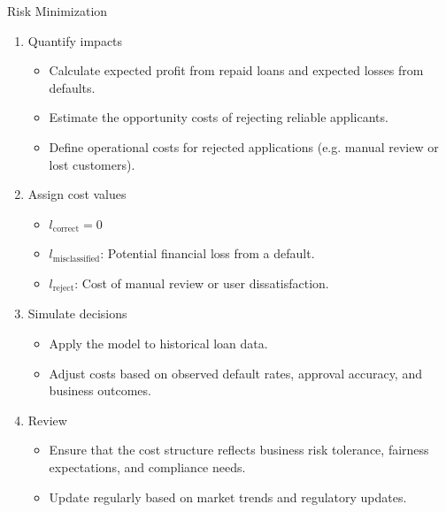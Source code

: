 \documentclass[
	english,
        solution=true
	]{tudaexercise}
\begin{document}
\begin{task}[points=11]{Risk Minimization}
\begin{subtask}[points=5]
\begin{solution}
\begin{enumerate}
    \item Quantify impacts \begin{itemize}
        \item Calculate expected profit from repaid loans and expected losses from defaults.
        \item Estimate the opportunity costs of rejecting reliable applicants.
        \item Define operational costs for rejected applications (e.g. manual review or lost customers).
    \end{itemize}

    \item Assign cost values
    \begin{itemize}
        \item \( l_{\text{correct}} = 0 \)
        \item \( l_{\text{misclassified}} \): Potential financial loss from a default.
        \item \( l_{\text{reject}} \): Cost of manual review or user dissatisfaction.
    \end{itemize}

    \item Simulate decisions
    \begin{itemize}
        \item Apply the model to historical loan data.
        \item Adjust costs based on observed default rates, approval accuracy, and business outcomes.
    \end{itemize}

    \item Review
    \begin{itemize}
        \item Ensure that the cost structure reflects business risk tolerance, fairness expectations, and compliance needs.
        \item Update regularly based on market trends and regulatory updates.
    \end{itemize}
\end{enumerate}

\end{solution}
\end{subtask}
\end{task}

\
\end{document}
